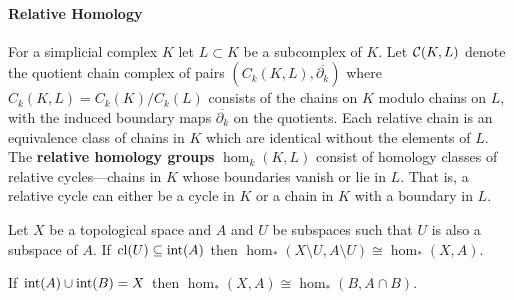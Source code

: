 \paragraph*{\textbf{Relative Homology}}


For a simplicial complex $K$ let $L\subset K$ be a subcomplex of $K$.
Let $\mathcal{C}(K, L)$ denote the quotient chain complex of pairs $(C_k(K, L), \overline{\partial_k})$ where $C_k(K, L) = C_k(K)/C_k(L)$ consists of the chains on $K$ modulo chains on $L$, with the induced boundary maps $\overline{\partial_k}$ on the quotients.
Each relative chain is an equivalence class of chains in $K$ which are identical without the elements of $L$.
The \textbf{relative homology groups} $\hom_k(K, L)$ consist of homology classes of relative cycles---chains in $K$ whose boundaries vanish or lie in $L$.
That is, a relative cycle can either be a cycle in $K$ or a chain in $K$ with a boundary in $L$.

\begin{theorem}[Excision]\label{thm:excision}
    Let $X$ be a topological space and $A$ and $U$ be subspaces such that $U$ is also a subspace of $A$.
    If $\mathrm{cl}(U)\subseteq \mathrm{int}(A)$ then $\hom_*(X\setminus U, A\setminus U)\cong \hom_*(X, A)$.
\end{theorem}

\begin{corollary}
    If $\mathrm{int}(A)\cup \mathrm{int}(B) = X$ then $\hom_*(X, A)\cong \hom_*(B, A\cap B)$.
\end{corollary}

